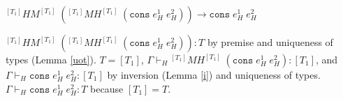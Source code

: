 \begin{case}
$^{[T_{1}]}HM^{[T_{1}]}\;(^{[T_{1}]}MH^{[T_{1}]}\;(\mathtt{cons}\;e_{H}^{1}\;e_{H}^{2}))\rightarrow\mathtt{cons}\;e_{H}^{1}\;e_{H}^{2}$

$^{[T_{1}]}HM^{[T_{1}]}\;(^{[T_{1}]}MH^{[T_{1}]}\;(\mathtt{cons}\;e_{H}^{1}\;e_{H}^{2})):T$ by premise and uniqueness of types (Lemma \ref{uot}).  $T=[T_{1}]$, $\Gamma\vdash_{H}{^{[T_{1}]}M}H^{[T_{1}]}\;(\mathtt{cons}\;e_{H}^{1}\;e_{H}^{2}):[T_{1}]$, and $\Gamma\vdash_{H}\mathtt{cons}\;e_{H}^{1}\;e_{H}^{2}:[T_{1}]$ by inversion (Lemma \ref{i}) and uniqueness of types.  $\Gamma\vdash_{H}\mathtt{cons}\;e_{H}^{1}\;e_{H}^{2}:T$ because $[T_{1}]=T$.
\end{case}